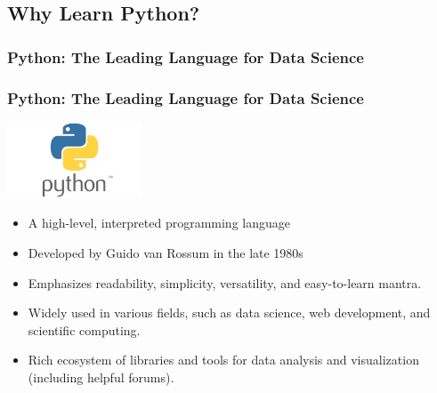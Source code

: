 \documentclass{beamer}
\begin{document}
    \subsection{Why Learn Python?}
    \subsubsection{Python: The Leading Language for Data Science}
    \begin{frame}
        \frametitle{Python: The Leading Language for Data Science}
        \begin{center}
            \includegraphics[width=0.3\textwidth]{figures/Python-Symbol}
        \end{center}
        \begin{itemize}
            \item A high-level, interpreted programming language
            \item Developed by Guido van Rossum in the late 1980s
            \item Emphasizes readability, simplicity, versatility, and easy-to-learn mantra.
            \item Widely used in various fields, such as data science, web development, and scientific computing.
            \item Rich ecosystem of libraries and tools for data analysis and visualization (including helpful forums).
        \end{itemize}
    \end{frame}
        
        
\end{document}

